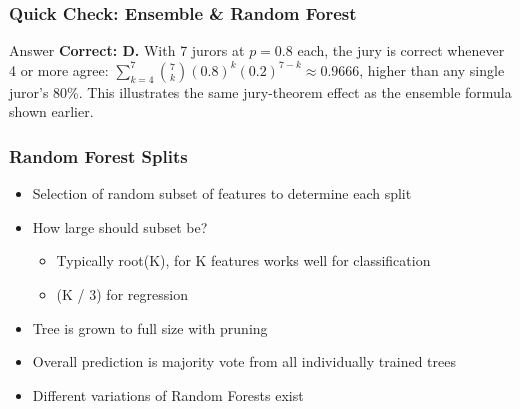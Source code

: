 \begin{frame}[fragile]\frametitle{Quick Check: Ensemble \& Random Forest}
\begin{block}{Answer}
\textbf{Correct: D.} With 7 jurors at $p=0.8$ each, the jury is correct whenever 4 or more
agree: $\sum_{k=4}^{7}{7 \choose k}(0.8)^k(0.2)^{7-k} \approx 0.9666$, higher than any
single juror's 80\%. This illustrates the same jury-theorem effect as the ensemble formula shown earlier.
\end{block}
\end{frame}

\begin{frame}[fragile]\frametitle{Random Forest Splits}
\begin{itemize}
\item Selection of random subset of features to determine each split
\item How large should subset be?
\begin{itemize}
\item Typically root(K), for K features works well for classification
\item (K / 3) for regression
\end{itemize}
\item Tree is grown to full size with pruning
\item Overall prediction is majority vote from all individually trained trees
\item Different variations of Random Forests exist
\end{itemize}
\end{frame}







